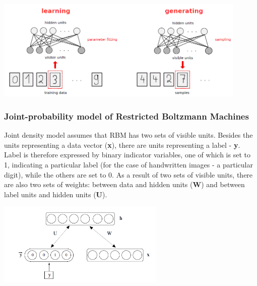 \documentclass[a4paper]{scrartcl}
\begin{document}
\begin{center}
\includegraphics[width=12cm]{images/generativeRBM.png}
\end{center}


\subsubsection{Joint-probability model of Restricted Boltzmann Machines}
Joint density model assumes that RBM has two sets of visible units. Besides the units representing a data vector ({\bfseries x}), there are units representing a label - {\bfseries y}. Label is therefore expressed by binary indicator variables, one of which is set to 1, indicating a particular label (for the case of handwritten images - a particular digit), while the others are set to 0. 
As a result of two sets of visible units, there are also two sets of weights: between data and hidden units ({\bfseries W}) and between label units and hidden units ({\bfseries U}). 
\begin{center}
\includegraphics[width=8cm]{images/jointProbModel2.png}
\end{center}
\end{document}
